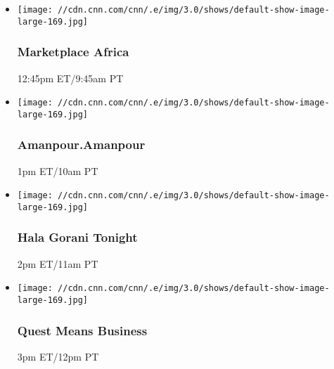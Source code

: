 \begin{itemize}
\item
  \texttt{[image: //cdn.cnn.com/cnn/.e/img/3.0/shows/default-show-image-large-169.jpg]}

  \hypertarget{marketplace-africa-5}{%
  \subsubsection{Marketplace Africa}\label{marketplace-africa-5}}

  12:45pm ET/9:45am PT
\end{itemize}

\begin{itemize}
\item
  \texttt{[image: //cdn.cnn.com/cnn/.e/img/3.0/shows/default-show-image-large-169.jpg]}

  \hypertarget{amanpouramanpour-}{%
  \subsubsection{Amanpour.Amanpour }\label{amanpouramanpour-}}

  1pm ET/10am PT
\end{itemize}

\begin{itemize}
\item
  \texttt{[image: //cdn.cnn.com/cnn/.e/img/3.0/shows/default-show-image-large-169.jpg]}

  \hypertarget{hala-gorani-tonight}{%
  \subsubsection{Hala Gorani Tonight}\label{hala-gorani-tonight}}

  2pm ET/11am PT
\end{itemize}

\begin{itemize}
\item
  \texttt{[image: //cdn.cnn.com/cnn/.e/img/3.0/shows/default-show-image-large-169.jpg]}

  \hypertarget{quest-means-business}{%
  \subsubsection{Quest Means Business}\label{quest-means-business}}

  3pm ET/12pm PT
\end{itemize}

